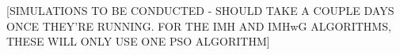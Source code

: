 \documentclass[12pt]{article}
\begin{document}
[SIMULATIONS TO BE CONDUCTED - SHOULD TAKE A COUPLE DAYS ONCE THEY'RE RUNNING. FOR THE IMH AND IMHwG ALGORITHMS, THESE WILL ONLY USE ONE PSO ALGORITHM]




\end{document}
